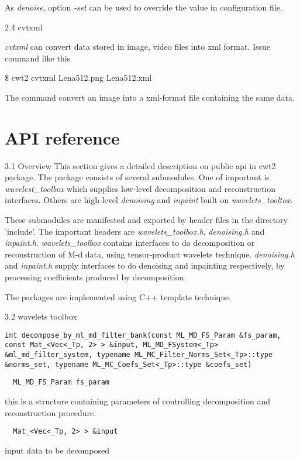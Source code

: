 \documentclass[a4paper,5pt]{article}
\begin{document}
As \textit{denoise}, option \textit{-set} can be used to override the value in configuration file.

2.4 cvtxml

\textit{cvtxml} can convert data stored in image, video files into xml format. Issue command like this

\$ cwt2 cvtxml Lena512.png Lena512.xml

The command convert an image into a xml-format file containing the same data.

\section{API reference}

3.1 Overview
This section gives a detailed description on public api in cwt2 package. The package consists of several submodules. One of important is \textit{wavelest\_toolbox} which supplies low-level  decomposition and reconstruction interfaces. Others are high-level \textit{denoising} and  \textit{inpaint} built on \textit{wavelets\_tooltox}.

These submodules are manifested and exported by header files in the directory 'include'. The important headers are \textit{wavelets\_toolbox.h}, \textit{denoising.h} and \textit{inpaint.h}. \textit{wavelets\_toolbox} contains interfaces to do decomposition or reconstruction of M-d data, using tensor-product wavelets technique. \textit{denoising.h} and \textit{inpaint.h} supply interfaces to do denoising and inpainting respectively, by processing coefficients produced by decomposition.

The packages are implemented using C++ template technique.

3.2 wavelets toolbox

\lstinline {int decompose_by_ml_md_filter_bank(const ML_MD_FS_Param &fs_param, const Mat_<Vec<_Tp, 2> > &input, ML_MD_FSystem<_Tp> &ml_md_filter_system, typename ML_MC_Filter_Norms_Set<_Tp>::type &norms_set, typename ML_MC_Coefs_Set<_Tp>::type &coefs_set) }

\begin{lstlisting}
  ML_MD_FS_Param fs_param
\end{lstlisting}
  this is a structure containing parameters of controlling decomposition and reconstruction procedure.
  
\begin{lstlisting}
  Mat_<Vec<_Tp, 2> > &input
\end{lstlisting}
  input data to be decomposed
  
\end{document}
